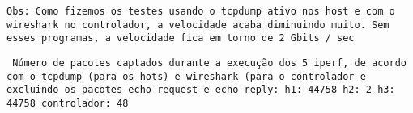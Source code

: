 \documentclass[12pt,letterpaper]{article}
\begin{document}
\texttt{Obs: Como fizemos os testes usando o tcpdump ativo nos host e com o wireshark no controlador, a velocidade acaba diminuindo muito. Sem esses programas, a velocidade fica em torno de 2 Gbits / sec} \newline \newline

\texttt{ Número de pacotes captados durante a execução dos 5 iperf, de acordo com o tcpdump (para os hots) e wireshark (para o controlador e excluindo os pacotes echo-request e echo-reply: \newline
h1: 44758 \newline
h2: 2 \newline
h3: 44758 \newline
controlador: 48
} \newline \newline
\end{document}
